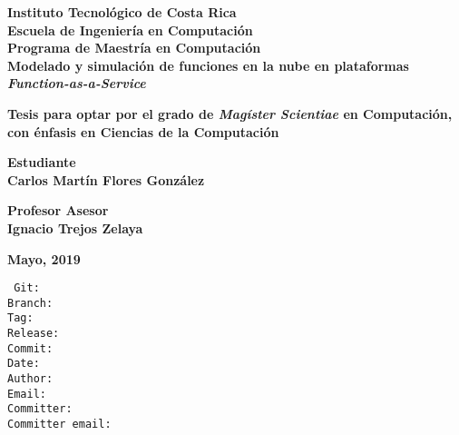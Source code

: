 \documentclass[12pt, twoside]{report}
\begin{document}
\thispagestyle{plain}
\begin{titlepage}
	\begin{center}
        {\fontsize{24}{28}\selectfont \textbf{Instituto Tecnológico de Costa Rica}\\}
        \vspace{1cm}
        {\fontsize{20}{24}\selectfont \textbf{Escuela de Ingeniería en Computación}\\}
        {\fontsize{18}{22}\selectfont \textbf{Programa de Maestría en Computación}\\}
        \vspace{2cm}
        {\fontsize{20}{24}\selectfont \textbf{Modelado y simulación de funciones en la nube en plataformas \textit{Function-as-a-Service}}}    
    
    
        \vspace{2cm}
        {\fontsize{14}{17}\selectfont \textbf{Tesis para optar por el grado de \emph{Magíster Scientiae} en Computación, con énfasis en Ciencias de la Computación
}}
        
       \vspace{1.5cm}
       {\fontsize{14}{17}\selectfont \textbf{Estudiante\\ Carlos Martín Flores González}} 
       
       \vspace{1cm}
       {\fontsize{14}{17}\selectfont \textbf{Profesor Asesor\\ Ignacio Trejos Zelaya}}
       
       \vspace{1.5cm}
       {\fontsize{14}{17}\selectfont \textbf{Mayo, 2019}}                       
        
    \end{center}
\end{titlepage}

{} 
\renewcommand*\contentsname{Índice}


\newpage
{\footnotesize
\noindent
\texttt{
Git: \gitReferences \\
Branch: \gitBranch \\
Tag: \gitVtag \\
Release: \gitReln{} \\
Commit: \gitAbbrevHash \\
Date: \gitAuthorIsoDate \\
Author: \gitAuthorName\\
Email: \gitAuthorEmail\\
Committer: \gitCommitterName\\
Committer email: \gitCommitterEmail
}}
\newpage




\end{document}
